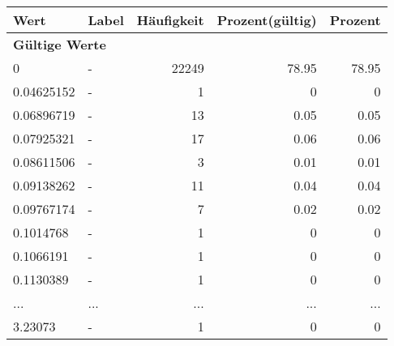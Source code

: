     \begin{longtable}{lXrrr}
     \toprule
     \textbf{Wert} & \textbf{Label} & \textbf{Häufigkeit} & \textbf{Prozent(gültig)} & \textbf{Prozent} \\
     \endhead
     \midrule
     \multicolumn{5}{l}{\textbf{Gültige Werte}}\\
        0 & \multicolumn{1}{X}{-} & %
          \num{22249} &
          \num[round-mode=places,round-precision=2]{78.95} &
          \num[round-mode=places,round-precision=2]{78.95} \\
        0.04625152 & \multicolumn{1}{X}{-} & %
          \num{1} &
          \num[round-mode=places,round-precision=2]{0} &
          \num[round-mode=places,round-precision=2]{0} \\
        0.06896719 & \multicolumn{1}{X}{-} & %
          \num{13} &
          \num[round-mode=places,round-precision=2]{0.05} &
          \num[round-mode=places,round-precision=2]{0.05} \\
        0.07925321 & \multicolumn{1}{X}{-} & %
          \num{17} &
          \num[round-mode=places,round-precision=2]{0.06} &
          \num[round-mode=places,round-precision=2]{0.06} \\
        0.08611506 & \multicolumn{1}{X}{-} & %
          \num{3} &
          \num[round-mode=places,round-precision=2]{0.01} &
          \num[round-mode=places,round-precision=2]{0.01} \\
        0.09138262 & \multicolumn{1}{X}{-} & %
          \num{11} &
          \num[round-mode=places,round-precision=2]{0.04} &
          \num[round-mode=places,round-precision=2]{0.04} \\
        0.09767174 & \multicolumn{1}{X}{-} & %
          \num{7} &
          \num[round-mode=places,round-precision=2]{0.02} &
          \num[round-mode=places,round-precision=2]{0.02} \\
        0.1014768 & \multicolumn{1}{X}{-} & %
          \num{1} &
          \num[round-mode=places,round-precision=2]{0} &
          \num[round-mode=places,round-precision=2]{0} \\
        0.1066191 & \multicolumn{1}{X}{-} & %
          \num{1} &
          \num[round-mode=places,round-precision=2]{0} &
          \num[round-mode=places,round-precision=2]{0} \\
        0.1130389 & \multicolumn{1}{X}{-} & %
          \num{1} &
          \num[round-mode=places,round-precision=2]{0} &
          \num[round-mode=places,round-precision=2]{0} \\
       ... & ... & ... & ... & ... \\
        3.23073 & \multicolumn{1}{X}{-} & %
          \num{1} &
          \num[round-mode=places,round-precision=2]{0} &
          \num[round-mode=places,round-precision=2]{0} \\


\end{longtable}
